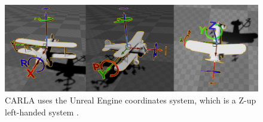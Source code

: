 \begin{figure}[ht]
    \centering
    \includegraphics[width=1.0\textwidth]{figures/carla-coordinates-system.jpeg}
    \caption{CARLA uses the Unreal Engine coordinates system, which is a Z-up left-handed system \cite{carla-coordinates-system}.}
    \label{fig:carla-coordinates-system}
\end{figure}